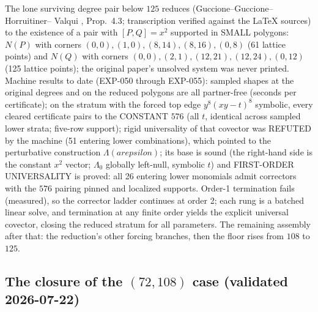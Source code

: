 \documentclass[11pt]{article}
\theoremstyle{remark}
\begin{document}
The lone surviving degree pair below $125$ reduces (Guccione--Guccione--Horruitiner--
Valqui \cite{GGHV2022}, Prop.~4.3; transcription verified against the LaTeX sources)
to the existence of a pair with $[P, Q] = x^2$ supported in SMALL polygons: $N(P)$ with
corners $(0,0), (1,0), (8,14), (8,16), (0,8)$ (61 lattice points) and $N(Q)$ with
corners $(0,0), (2,1), (12,21), (12,24), (0,12)$ (125 lattice points); the original
paper's unsolved system was never printed. Machine results to date (EXP-050 through
EXP-055): sampled shapes at the original degrees and on the reduced polygons are all
partner-free (seconds per certificate); on the stratum with the forced top edge
$y^8 (xy - t)^8$ symbolic, every cleared certificate pairs to the CONSTANT $576$
(all $t$, identical across sampled lower strata; five-row support); rigid universality
of that covector was REFUTED by the machine (51 entering lower combinations), which
pointed to the perturbative construction $\Lambda(arepsilon)$; its base is sound
(the right-hand side is the constant $x^2$ vector; $\Lambda_0$ globally left-null,
symbolic $t$) and FIRST-ORDER UNIVERSALITY is proved: all 26 entering lower monomials
admit correctors with the $576$ pairing pinned and localized supports. Order-1
termination fails (measured), so the corrector ladder continues at order 2; each rung
is a batched linear solve, and termination at any finite order yields the explicit
universal covector, closing the reduced stratum for all parameters. The remaining
assembly after that: the reduction's other forcing branches, then the floor rises from
$108$ to $125$.

\subsection*{The closure of the $(72, 108)$ case (validated 2026-07-22)}
\end{document}
